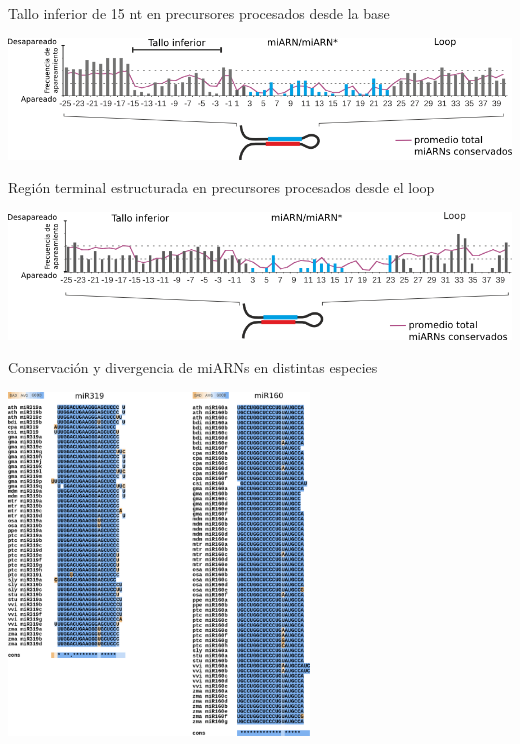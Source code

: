 \documentclass{beamer}
\begin{document}
\begin{frame}{Tallo inferior de 15 nt en precursores procesados desde la base}
	\begin{center}
		\includegraphics[width=1\textwidth]{img/GR_fig2C.png}
	\end{center}
\end{frame}

\begin{frame}{Región terminal estructurada en precursores procesados desde el loop}
	\begin{center}
		\includegraphics[width=1\textwidth]{img/GR_fig4C.png}
	\end{center}
\end{frame}

\begin{frame}{Conservación y divergencia de miARNs en distintas especies}
	\begin{center}
		\includegraphics[width=0.6\textwidth]{img/variabilidad_maduro.png}
	\end{center}
\end{frame}
\end{document}
